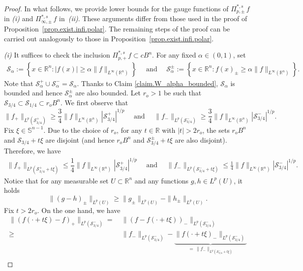 \documentclass[11pt, reqno]{article}
\theoremstyle{definition}
\numberwithin{equation}{section}
\newcommand{\R}{\mathbb{R}}
\newcommand{\Sphere}{\mathbb{S}^{n - 1}}
\newcommand{\Sset}{\mathscr S}
\begin{document}
\begin{proof}
In what follows, we provide lower bounds for the gauge functions of $\Pi^{\ast, s}_{p, \pm} \, f$ in \textit{(i)} and $\Pi^{\ast, s}_{\infty, \pm} \, f$ in~\textit{(ii)}.
These arguments differ from those used in the proof of Proposition~\ref{prop.exist.infi.polar}. 
The remaining steps of the proof can be carried out analogously to those in Proposition~\ref{prop.exist.infi.polar}.

\medskip

\textit{(i)}
It suffices to check the inclusion $\Pi^{\ast, s}_{p, +} \, f \subset c B^n$.
For any fixed ${\alpha \in (0, 1)}$, set
\begin{align*}
	\Sset_{\alpha} := \left\{ x \in \R^n : |f(x)| \geq \alpha \| f \|_{L^\infty(\R^n)} \right\}
	\quad \text{ and } \quad 
	\Sset_{\alpha}^\pm := \left\{ x \in \R^n : f(x)_{\pm} \geq \alpha \| f \|_{L^\infty(\R^n)} \right\}.
\end{align*}
Note that $\Sset_{\alpha}^{+} \cup \Sset_{\alpha}^{-} = \Sset_{\alpha}$.
Thanks to Claim \ref{claim.W_alpha_bounded}, $\Sset_\alpha$ is bounded and hence $\Sset_{\alpha}^{\pm}$  are also bounded.
Let $r_o > 1$ be such that $\Sset_{3/4} \subset \Sset_{1/4} \subset r_o B^n$.
We first observe that
	\[
		\| f_+ \|_{L^p(\Sset_{3/4}^+)} \geq \dfrac{3}{4} \| f \|_{L^\infty(\R^n)} | \Sset_{3/4}^+ |^{1/p} 
		\quad \text{ and } \quad 
		\| f_- \|_{L^p(\Sset_{3/4}^-)} \geq \dfrac{3}{4} \| f \|_{L^\infty(\R^n)} | \Sset_{3/4}^- |^{1/p}.
	\]
Fix $\xi \in \Sphere$.
Due to the choice of $r_o$, for any $t \in \R$ with $|t| > 2r_o$, the sets $r_o B^n$ and $\Sset_{3/4} + t \xi$ are disjoint (and hence \(r_o B^n\) and \(\Sset_{3/4}^{\pm} + t \xi\) are also disjoint).
Therefore, we have
	\begin{align*}
		\| f_+ \|_{L^p(\Sset_{3/4}^+ + t\xi)} \leq \dfrac{1}{4} \| f \|_{L^\infty(\R^n)} | \Sset_{3/4}^+ |^{1/p}
		\quad \text{ and } \quad 
		\| f_- \|_{L^p(\Sset_{3/4}^- + t \xi)} \leq \frac{1}{4} \| f \|_{L^\infty(\R^n)} | \Sset_{3/4}^- |^{1/p}.
	\end{align*}
Notice that for any measurable set $U \subset \R^n$ and any functions $g, h \in L^p(U)$, it holds 
\[
\| (g - h)_\pm \|_{L^p(U)} \geq \| g_\pm \|_{L^p(U)} - \| h_\pm \|_{L^p(U)}.
\]
Fix $t > 2r_o$.
On the one hand, we have
\begin{align*}
	\| (f(\cdot + t\xi) - f )_+ \|_{L^p(\Sset_{3/4}^-)} 
    = & ~ 
    \| (f - f(\cdot + t \xi))_- \|_{L^p(\Sset_{3/4}^-)} \\
    \geq & ~ \| f_- \|_{L^p(\Sset^-_{3/4})} -  \underbrace{\| f(\cdot + t\xi)_- \|_{L^p(\Sset^-_{3/4})} }_{\, = \, \| f_- \|_{L^p(\Sset^-_{3/4} + t\xi)} } \\

\end{align*}
\end{proof}
\end{document}
